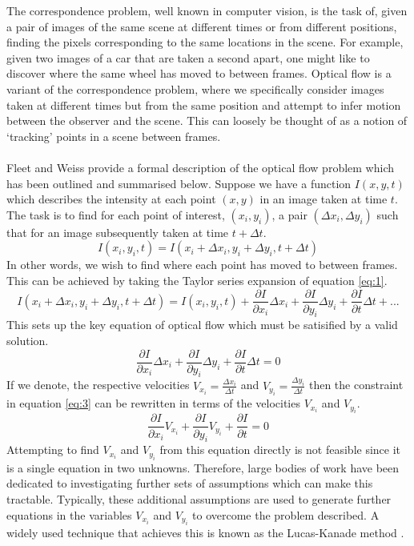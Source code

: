 The correspondence problem, well known in computer vision, is the task of, given a pair of images of the same scene at different times or from different positions, finding 
the pixels corresponding to the same locations in the scene.
For example, given two images of a car that are taken a second apart, one might like to discover where the same wheel has moved to between frames.
Optical flow is a variant of the correspondence problem, where we specifically consider images taken at different times but from the same position and attempt to infer motion between the observer 
and the scene. This can loosely be thought of as a notion of `tracking' points in a scene between frames.
\\\\
Fleet and Weiss \cite{Fleet2006} provide a formal description of the optical flow problem which has been outlined and summarised below.
Suppose we have a function $I(x,y,t)$ which describes the intensity at each point $(x,y)$ in an image taken at time $t$. 
The task is to find for each point of interest, $(x_i, y_i)$,
a pair $(\Delta x_i, \Delta y_i)$ such that for an image subsequently taken at time $t + \Delta t$.
\begin{equation}
 I(x_i,y_i,t) = I(x_i + \Delta x_i, y_i + \Delta y_i, t+\Delta t)
 \label{eq:1}
\end{equation}
In other words, we wish to find where each point has moved to between frames.
This can be achieved by taking the Taylor series expansion of equation \ref{eq:1}.
\begin{equation}
I(x_i + \Delta x_i, y_i + \Delta y_i, t+\Delta t) = I(x_i,y_i,t) + \frac{\partial I}{\partial x_i}\Delta x_i + \frac{\partial I}{\partial y_i} \Delta y_i + \frac{\partial I}{\partial t} \Delta t + ... 
\label{eq:2}
\end{equation}
This sets up the key equation of optical flow which must be satisified by a valid solution.
\begin{equation}
    \frac{\partial I}{\partial x_i}\Delta x_i + \frac{\partial I}{\partial y_i} \Delta y_i + \frac{\partial I}{\partial t} \Delta t  = 0
    \label{eq:3}
\end{equation}
If we denote, the respective velocities $V_{x_i} = \frac{\Delta x_i}{\Delta t}$ and $V_{y_i} = \frac{\Delta y_i}{\Delta t}$ then the constraint in equation \ref{eq:3} 
can be rewritten in terms of the velocities $V_{x_i}$ and $V_{y_i}$.
\begin{equation*}
    \frac{\partial I}{\partial x_i}V_{x_i} + \frac{\partial I}{\partial y_i}  V_{y_i} + \frac{\partial I}{\partial t}  = 0
\end{equation*}
Attempting to find $V_{x_i}$ and $V_{y_i}$ from this equation directly is not feasible since it is a single equation in two unknowns.
Therefore, large bodies of work have been dedicated to investigating further sets of assumptions which can make this tractable.
Typically, these additional assumptions are used to generate further equations in the variables $V_{x_i}$ and $V_{y_i}$ to overcome the problem described. A widely used technique that achieves this is
known as the Lucas-Kanade method \cite{LucasKanade}.

